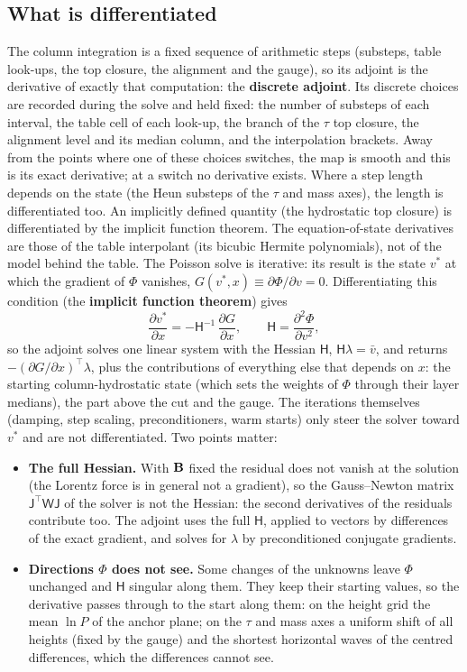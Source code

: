 \subsection{What is differentiated}
\ifadjointcolumn
The column integration is a fixed sequence of arithmetic steps (substeps, table look-ups, the top closure, the alignment and
the gauge), so its adjoint is the derivative of exactly that computation: the \textbf{discrete adjoint}. Its discrete choices
are recorded during the solve and held fixed: the number of substeps of each interval, the table cell of each look-up, the
branch of the $\tau$ top closure, the alignment level and its median column, and the interpolation brackets. Away from the
points where one of these choices switches, the map is smooth and this is its exact derivative; at a switch no derivative
exists. Where a step length depends on the state (the Heun substeps of the $\tau$ and mass axes), the length is
differentiated too. An implicitly defined quantity (the hydrostatic top closure) is differentiated by the implicit function
theorem. The equation-of-state derivatives are those of the table interpolant (its bicubic Hermite polynomials), not of the model behind the table.
\fi
\ifadjointpoisson
The Poisson solve is iterative: its result is the state $v^*$ at which the gradient of $\Phi$ vanishes,
$G(v^*,x)\equiv\partial\Phi/\partial v=0$. Differentiating this condition (the \textbf{implicit function theorem}) gives
\begin{equation}
\frac{\partial v^*}{\partial x}=-\mathsf H^{-1}\,\frac{\partial G}{\partial x},\qquad
\mathsf H=\frac{\partial^2\Phi}{\partial v^2},\label{eq:ift}
\end{equation}
so the adjoint solves one linear system with the Hessian $\mathsf H$, $\mathsf H\lambda=\bar v$, and returns
$-(\partial G/\partial x)^{\top}\lambda$, plus the contributions of everything else that depends on $x$: the starting
column-hydrostatic state (which sets the weights of $\Phi$ through their layer medians), the part above the cut and the
gauge. The iterations themselves (damping, step scaling, preconditioners, warm starts) only steer the solver toward $v^*$
and are not differentiated. Two points matter:
\begin{itemize}
\item \textbf{The full Hessian.} With $\mathbf B$ fixed the residual does not vanish at the solution (the Lorentz force is in general
not a gradient), so the Gauss--Newton matrix $\mathsf J^{\top}\mathsf W\mathsf J$ of the solver is not the Hessian: the second
derivatives of the residuals contribute too. The adjoint uses the full $\mathsf H$, applied to vectors by differences of the
exact gradient, and solves for $\lambda$ by preconditioned conjugate gradients.
\item \textbf{Directions $\Phi$ does not see.} Some changes of the unknowns leave $\Phi$ unchanged and $\mathsf H$ singular along
them. They keep their starting values, so the derivative passes through to the start along them: on the height grid the mean
$\ln P$ of the anchor plane; on the $\tau$ and mass axes a uniform shift of all heights (fixed by the gauge) and the shortest
horizontal waves of the centred differences, which the differences cannot see.
\end{itemize}
